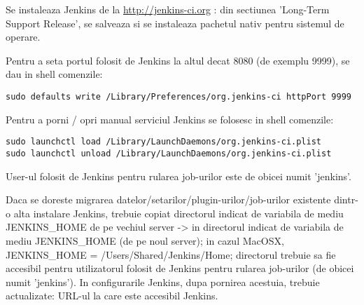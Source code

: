 Se instaleaza Jenkins de la \url{http://jenkins-ci.org} : 
din sectiunea 'Long-Term Support Release', 
se salveaza si se instaleaza pachetul nativ pentru sistemul de operare.

Pentru a seta portul folosit de Jenkins la altul decat 8080 (de exemplu 9999), se dau in shell comenzile:
\begin{lstlisting}[breaklines=true]
sudo defaults write /Library/Preferences/org.jenkins-ci httpPort 9999
\end{lstlisting}

Pentru a porni / opri manual serviciul Jenkins se folosesc in shell comenzile: 
\begin{lstlisting}[breaklines=true]
sudo launchctl load /Library/LaunchDaemons/org.jenkins-ci.plist
sudo launchctl unload /Library/LaunchDaemons/org.jenkins-ci.plist
\end{lstlisting}

User-ul folosit de Jenkins pentru rularea job-urilor este de obicei numit 'jenkins'.

Daca se doreste migrarea datelor/setarilor/plugin-urilor/job-urilor existente dintr-o alta instalare Jenkins, trebuie copiat directorul indicat de variabila de mediu JENKINS\_HOME de pe vechiul server -> in directorul indicat de variabila de mediu JENKINS\_HOME (de pe noul server); in cazul MacOSX, JENKINS\_HOME = /Users/Shared/Jenkins/Home; directorul trebuie sa fie accesibil pentru utilizatorul folosit de Jenkins pentru rularea job-urilor (de obicei numit 'jenkins'). In configurarile Jenkins, dupa pornirea acestuia,  trebuie actualizate: URL-ul la care este accesibil Jenkins.

